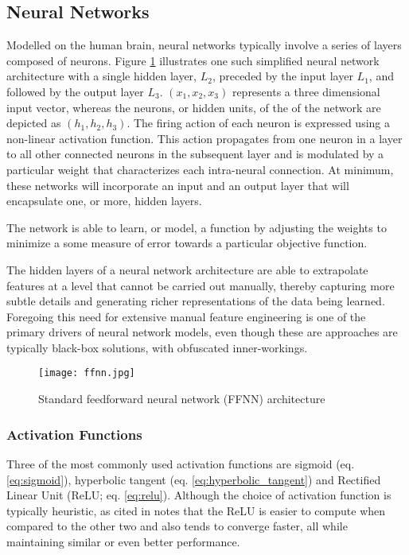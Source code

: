 \documentclass[../../fyp.tex]{subfiles}
\begin{document}
\subsection{Neural Networks}
Modelled on the human brain, neural networks typically involve a series of layers composed of neurons. Figure \ref{fig:ffnn} illustrates one such simplified neural network architecture with a single hidden layer, $L_2$, preceded by the input layer $L_1$, and followed by the output layer $L_3$. $(x_1, x_2, x_3)$ represents a three dimensional input vector, whereas the neurons, or hidden units, of the of the network are depicted as $(h_1, h_2, h_3)$. The firing action of each neuron is expressed using a non-linear activation function. This action propagates from one neuron in a layer to all other connected neurons in the subsequent layer and is modulated by a particular weight that characterizes each intra-neural connection. At minimum, these networks will incorporate an input and an output layer that will encapsulate one, or more, hidden layers.

The network is able to learn, or model, a function by adjusting the weights to minimize a some measure of error towards a particular objective function. \cite{graves2012b}

The hidden layers of a neural network architecture are able to extrapolate features at a level that cannot be carried out manually, thereby capturing more subtle details and generating richer representations of the data being learned. Foregoing this need for extensive manual feature engineering is one of the primary drivers of neural network models, even though these are approaches are typically black-box solutions, with obfuscated inner-workings.

\begin{figure}[!ht]
	\centering
	\texttt{[image: ffnn.jpg]}
	\caption{Standard feedforward neural network (FFNN) architecture \cite{zhang2018}}
	\label{fig:ffnn}
\end{figure}

\subsubsection{Activation Functions}
Three of the most commonly used activation functions are sigmoid (eq. \ref{eq:sigmoid}), hyperbolic tangent (eq. \ref{eq:hyperbolic_tangent}) and Rectified Linear Unit (ReLU; eq. \ref{eq:relu}). Although the choice of activation function is typically heuristic, \cite{glorot2011} as cited in \cite{zhang2018} notes that the ReLU is easier to compute when compared to the other two and also tends to converge faster, all while maintaining similar or even better performance.
\end{document}
